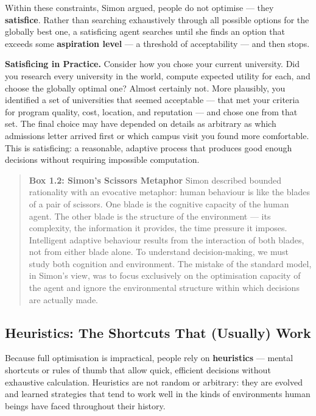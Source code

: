\documentclass[12pt, letterpaper]{article}
\begin{document}
Within these constraints, Simon argued, people do not optimise --- they \textbf{satisfice}. Rather than searching exhaustively through all possible options for the globally best one, a satisficing agent searches until she finds an option that exceeds some \textbf{aspiration level} --- a threshold of acceptability --- and then stops.

\textbf{Satisficing in Practice.} Consider how you chose your current university. Did you research every university in the world, compute expected utility for each, and choose the globally optimal one? Almost certainly not. More plausibly, you identified a set of universities that seemed acceptable --- that met your criteria for program quality, cost, location, and reputation --- and chose one from that set. The final choice may have depended on details as arbitrary as which admissions letter arrived first or which campus visit you found more comfortable. This is satisficing: a reasonable, adaptive process that produces good enough decisions without requiring impossible computation.

\begin{quote}
\textbf{Box 1.2: Simon's Scissors Metaphor}
Simon described bounded rationality with an evocative metaphor: human behaviour is like the blades of a pair of scissors. One blade is the cognitive capacity of the human agent. The other blade is the structure of the environment --- its complexity, the information it provides, the time pressure it imposes. Intelligent adaptive behaviour results from the interaction of both blades, not from either blade alone. To understand decision-making, we must study both cognition and environment. The mistake of the standard model, in Simon's view, was to focus exclusively on the optimisation capacity of the agent and ignore the environmental structure within which decisions are actually made.
\end{quote}




\subsection{Heuristics: The Shortcuts That (Usually) Work}


Because full optimisation is impractical, people rely on \textbf{heuristics} --- mental shortcuts or rules of thumb that allow quick, efficient decisions without exhaustive calculation. Heuristics are not random or arbitrary: they are evolved and learned strategies that tend to work well in the kinds of environments human beings have faced throughout their history.
\end{document}
